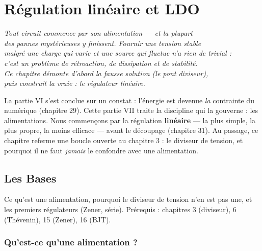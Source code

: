 \documentclass[12pt,a4paper,twoside]{book}
\begin{document}
\chapter{Régulation linéaire et LDO}

\begin{center}
\textit{Tout circuit commence par son alimentation --- et la plupart\\
des pannes mystérieuses y finissent. Fournir une tension stable\\
malgré une charge qui varie et une source qui fluctue n'a rien de trivial :\\
c'est un problème de rétroaction, de dissipation et de stabilité.\\
Ce chapitre démonte d'abord la fausse solution (le pont diviseur),\\
puis construit la vraie : le régulateur linéaire.}
\end{center}

\vspace{0.5cm}

La partie VI s'est conclue sur un constat : l'énergie est devenue \textit{la} contrainte du numérique (chapitre 29). Cette partie VII traite la discipline qui la gouverne : les alimentations. Nous commençons par la régulation \textbf{linéaire} --- la plus simple, la plus propre, la moins efficace --- avant le découpage (chapitre 31). Au passage, ce chapitre referme une boucle ouverte au chapitre 3 : le diviseur de tension, et pourquoi il ne faut \textit{jamais} le confondre avec une alimentation.

\section{Les Bases}

\begin{bases}
Ce qu'est une alimentation, pourquoi le diviseur de tension n'en est pas une, et les premiers régulateurs (Zener, série). Prérequis : chapitres 3 (diviseur), 6 (Thévenin), 15 (Zener), 16 (BJT).
\end{bases}

\subsection{Qu'est-ce qu'une alimentation ?}
\end{document}
